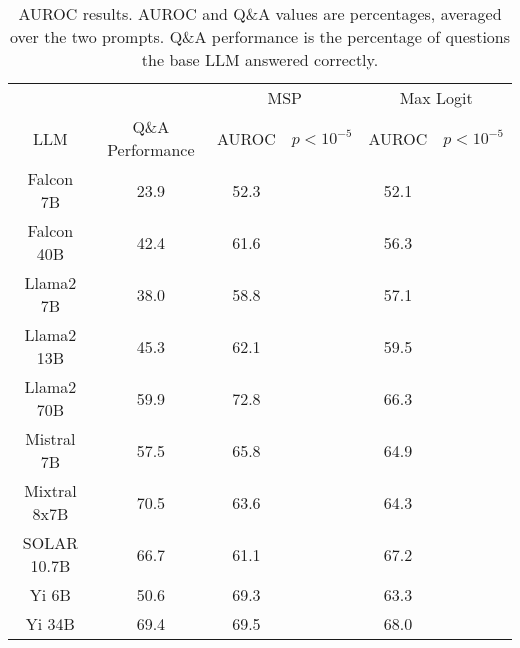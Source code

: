\begin{table*}
\centering
\begin{tabular}{c|c|c|c|c|c}
& & \multicolumn{2}{c|}{MSP} & \multicolumn{2}{c}{Max Logit} \\ 
LLM & Q\&A Performance & AUROC & $p < 10^{-5}$ & AUROC & $p < 10^{-5}$\\ \hline
Falcon 7B & 23.9 & 52.3 &  & 52.1 & \\
Falcon 40B & 42.4 & 61.6 &  & 56.3 & \\
Llama2 7B & 38.0 & 58.8 &  & 57.1 & \\
Llama2 13B & 45.3 & 62.1 &  & 59.5 & \\
Llama2 70B & 59.9 & 72.8 &  & 66.3 & \\
Mistral 7B & 57.5 & 65.8 &  & 64.9 & \\
Mixtral 8x7B & 70.5 & 63.6 &  & 64.3 & \\
SOLAR 10.7B & 66.7 & 61.1 &  & 67.2 & \\
Yi 6B & 50.6 & 69.3 &  & 63.3 & \\
Yi 34B & 69.4 & 69.5 &  & 68.0 & \\
\hline
\end{tabular}
\caption{AUROC results. AUROC and Q\&A values are percentages, averaged over the two prompts. Q\&A performance is the percentage of questions the base LLM answered correctly.}
\label{tab:auroc}
\end{table*}
